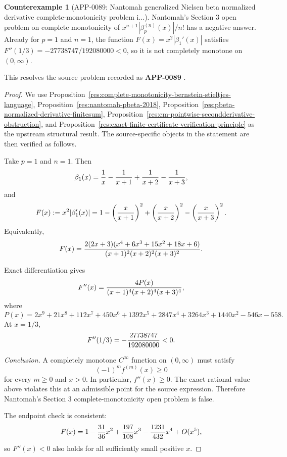 \documentclass[11pt]{article}
\numberwithin{equation}{section}
\theoremstyle{definition}
\newtheorem{counterexample}[theorem]{Counterexample}
\theoremstyle{remark}
\newcommand{\1}{\mathbf 1}
\begin{document}
\begin{counterexample}[APP-0089: Nantomah generalized Nielsen beta normalized derivative complete-monotonicity problem i...]
\label{res:nantomah-pbeta-normalizedderivativecm-false-p1n1}
Nantomah's Section 3 open problem on complete monotonicity of \(x^{n+1}|\beta_p^{(n)}(x)|/n!\) has a negative answer. Already for \(p=1\) and \(n=1\), the function \(F(x)=x^2|\beta_1'(x)|\) satisfies \(F''(1/3)=-27738747/192080000<0\), so it is not completely monotone on \((0,\infty)\).



This resolves the source problem recorded as \textbf{APP-0089} \cite{app-app-0089-source}.
\end{counterexample}

\begin{proof}
We use Proposition~\ref{res:complete-monotonicity-bernstein-stieltjes-language}, Proposition~\ref{res:nantomah-pbeta-2018}, Proposition~\ref{res:pbeta-normalized-derivative-finitesum}, Proposition~\ref{res:cm-pointwise-secondderivative-obstruction}, and Proposition~\ref{res:exact-finite-certificate-verification-principle} as the upstream structural result. The source-specific objects in the statement are then verified as follows.

Take \(p=1\) and \(n=1\). Then
\[
\beta_1(x)={1\over x}-{1\over x+1}+{1\over x+2}-{1\over x+3},
\]
and
\[
F(x):=x^2|\beta_1'(x)|
=1-\left({x\over x+1}\right)^2
+\left({x\over x+2}\right)^2
-\left({x\over x+3}\right)^2.
\]
Equivalently,
\[
F(x)=
{2(2x+3)(x^4+6x^3+15x^2+18x+6)
\over (x+1)^2(x+2)^2(x+3)^2}.
\]

Exact differentiation gives
\[
F''(x)=
{4P(x)\over (x+1)^4(x+2)^4(x+3)^4},
\]
where
\[
P(x)=2x^9+21x^8+112x^7+450x^6+1392x^5+2847x^4
+3264x^3+1440x^2-546x-558.
\]
At \(x=1/3\),
\[
F''(1/3)=-{27738747\over 192080000}<0.
\]

\emph{Conclusion.}
A completely monotone \(C^\infty\) function on \((0,\infty)\) must satisfy
\[
(-1)^m f^{(m)}(x)\ge0
\]
for every \(m\ge0\) and \(x>0\). In particular, \(f''(x)\ge0\). The exact rational value above violates this at an admissible point for the source expression. Therefore Nantomah's Section 3 complete-monotonicity open problem is false.

The endpoint check is consistent:
\[
F(x)=1-{31\over36}x^2+{197\over108}x^3-{1231\over432}x^4+O(x^5),
\]
so \(F''(x)<0\) also holds for all sufficiently small positive \(x\).
\end{proof}
\end{document}
